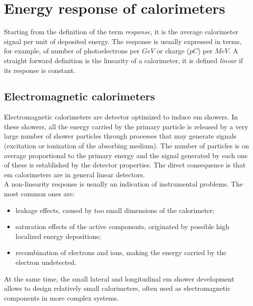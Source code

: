 \section{Energy response of calorimeters}
Starting from the definition of the term \textit{response}, it is the average calorimeter signal per unit of deposited energy. The response is usually expressed in  terms, for example, of number of photoelectrons per $GeV$ or charge ($pC$) per  $MeV$. A straight forward definition is the linearity of a calorimeter, it is defined \textit{linear} if its response is constant.\\

\subsection*{Electromagnetic calorimeters}
Electromagnetic calorimeters are detector optimized to induce em showers. In these showers, all the energy carried by the primary particle is released by a very large number of shower particles through processes that may generate signals (excitation or ionization of the absorbing medium). The number of particles is on average proportional to the primary energy and the signal generated by each one of these is established by the detector properties. The direct consequence is that em calorimeters are in general linear detectors.\\
A non-linearity response is usually an indication of instrumental problems. The most common ones are:
\begin{itemize}
    \item leakage effects, caused by too small dimensions of the calorimeter;
    \item saturation effects of the active components, originated by possible high localized energy depositions;
    \item recombination of electrons and ions, making the energy carried by the electron undetected.
\end{itemize}

At the same time, the small lateral and longitudinal em shower development allows to design relatively small calorimeters, often used as electromagnetic components in more complex systems.\\

